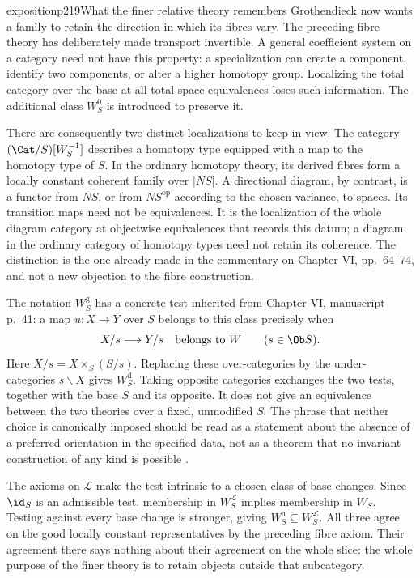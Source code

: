 \begin{dcomment}{exposition}{p219}{What the finer relative theory remembers}
Grothendieck now wants a family to retain the direction in which its fibres vary. The preceding fibre theory has deliberately made transport invertible. A general coefficient system on a category need not have this property: a specialization can create a component, identify two components, or alter a higher homotopy group. Localizing the total category over the base at all total-space equivalences loses such information. The additional class $W^0_S$ is introduced to preserve it.

There are consequently two distinct localizations to keep in view. The category $(\Cat/S)[W_S^{-1}]$ describes a homotopy type equipped with a map to the homotopy type of $S$. In the ordinary homotopy theory, its derived fibres form a locally constant coherent family over $|NS|$. A directional diagram, by contrast, is a functor from $NS$, or from $NS^{\mathrm{op}}$ according to the chosen variance, to spaces. Its transition maps need not be equivalences. It is the localization of the whole diagram category at objectwise equivalences that records this datum; a diagram in the ordinary category of homotopy types need not retain its coherence. The distinction is the one already made in the commentary on Chapter VI, pp.~64--74, and not a new objection to the fibre construction.

The notation $W^{\mathrm g}_S$ has a concrete test inherited from Chapter VI, manuscript p.~41: a map $u:X\to Y$ over $S$ belongs to this class precisely when
\[
 X/s\longrightarrow Y/s\quad\hbox{belongs to }W
 \qquad(s\in\Ob S).
\]
Here $X/s=X\times_S(S/s)$. Replacing these over-categories by the under-categories $s\backslash X$ gives $W^{\mathrm d}_S$. Taking opposite categories exchanges the two tests, together with the base $S$ and its opposite. It does not give an equivalence between the two theories over a fixed, unmodified $S$. The phrase that neither choice is canonically imposed should be read as a statement about the absence of a preferred orientation in the specified data, not as a theorem that no invariant construction of any kind is possible \citep[Chapter VI, manuscript pp.~41--42]{Grothendieck1990VI}.

The axioms on $\mathcal L$ make the test intrinsic to a chosen class of base changes. Since $\id_S$ is an admissible test, membership in $W^{\mathcal L}_S$ implies membership in $W_S$. Testing against every base change is stronger, giving $W^{\mathrm u}_S\subseteq W^{\mathcal L}_S$. All three agree on the good locally constant representatives by the preceding fibre axiom. Their agreement there says nothing about their agreement on the whole slice: the whole purpose of the finer theory is to retain objects outside that subcategory.
\end{dcomment}

